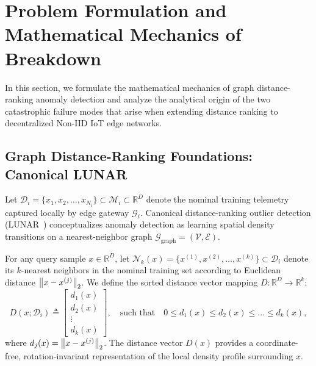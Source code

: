 
\section{Problem Formulation and Mathematical Mechanics of Breakdown}
\label{sec:formulation}

In this section, we formulate the mathematical mechanics of graph distance-ranking anomaly detection and analyze the analytical origin of the two catastrophic failure modes that arise when extending distance ranking to decentralized Non-IID IoT edge networks.

\subsection{Graph Distance-Ranking Foundations: Canonical LUNAR}
\label{subsec:lunar_foundations}

Let $\mathcal{D}_i = \{x_1, x_2, \dots, x_{N_i}\} \subset \mathcal{M}_i \subset \mathbb{R}^D$ denote the nominal training telemetry captured locally by edge gateway $\mathcal{G}_i$. Canonical distance-ranking outlier detection (LUNAR~\cite{goodge2022lunar}) conceptualizes anomaly detection as learning spatial density transitions on a nearest-neighbor graph $\mathcal{G}_{\text{graph}} = (\mathcal{V}, \mathcal{E})$. 

For any query sample $x \in \mathbb{R}^D$, let $\mathcal{N}_k(x) = \{x^{(1)}, x^{(2)}, \dots, x^{(k)}\} \subset \mathcal{D}_i$ denote its $k$-nearest neighbors in the nominal training set according to Euclidean distance $\left\lVert x - x^{(j)}\right\rVert_2$. We define the sorted distance vector mapping $D: \mathbb{R}^D \to \mathbb{R}^k$:
\begin{equation}
\label{eq:sorted_distance_vector}
D(x; \mathcal{D}_i) \triangleq \begin{bmatrix} d_1(x) \\ d_2(x) \\ \vdots \\ d_k(x) \end{bmatrix}, \quad \text{such that} \quad 0 \le d_1(x) \le d_2(x) \le \dots \le d_k(x),
\end{equation}
where $d_j(x) = \left\lVert x - x^{(j)}\right\rVert_2$. The distance vector $D(x)$ provides a coordinate-free, rotation-invariant representation of the local density profile surrounding $x$.

